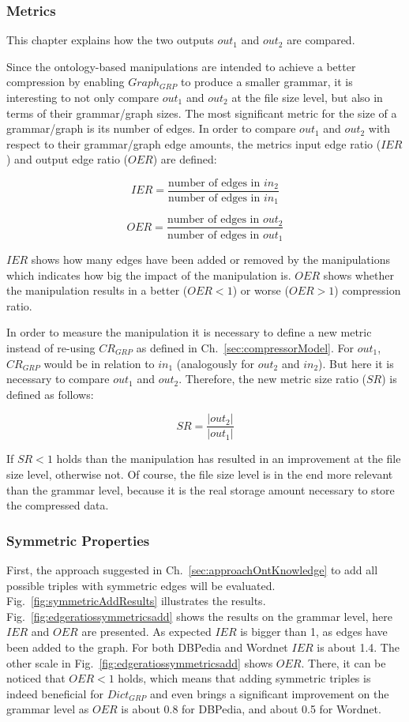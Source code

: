 \subsubsection{Metrics}

This chapter explains how the two outputs $out_1$ and $out_2$ are compared.

Since the ontology-based manipulations are intended to achieve a better compression by enabling $Graph_{GRP}$ to produce a smaller grammar, it is interesting to not only compare $out_1$ and $out_2$ at the file size level, but also in terms of their grammar/graph sizes. The most significant metric for the size of a grammar/graph is its number of edges. In order to compare $out_1$ and $out_2$ with respect to their grammar/graph edge amounts, the metrics input edge ratio ($IER$) and output edge ratio ($OER$)  are defined:
 
 \[
 IER=\frac {\text{number of edges in } in_2} {\text{number of edges in  } in_1}
 \]
 
 \[
 OER=\frac {\text{number of edges in } out_2} {\text{number of edges in } out_1}
 \]
 
$IER$ shows how many edges have been added or removed by the manipulations which indicates how big the impact of the manipulation is. $OER$  shows whether the manipulation results in a better ($OER<1$) or worse ($OER>1$) compression ratio.

In order to measure the manipulation it is necessary to define a new metric instead of re-using $CR_{GRP}$ as defined in Ch.~\ref{sec:compressorModel}. For $out_1$, $CR_{GRP}$ would be in relation to $in_1$ (analogously for $out_2$ and $in_2$). But here it is necessary to compare $out_1$ and $out_2$. Therefore, the new metric size ratio ($SR$) is defined as follows:

 \[
SR=\frac {|out_2|} {|out_1|}
\]

If $SR<1$ holds than the manipulation has resulted in an improvement at the file size level, otherwise not. Of course, the file size level is in the end more relevant than the grammar level, because it is the real storage amount necessary to store the compressed data.



\subsubsection{Symmetric Properties}

First, the approach suggested in Ch.~\ref{sec:approachOntKnowledge} to add all possible triples with symmetric edges will be evaluated. Fig.~\ref{fig:symmetricAddResults} illustrates the results. Fig.~\ref{fig:edgeratiossymmetricsadd} shows the results on the grammar level, here $IER$ and $OER$ are presented. As expected $IER$ is bigger than 1, as edges have been added to the graph. For both DBPedia and Wordnet $IER$ is about 1.4. The other scale in Fig.~\ref{fig:edgeratiossymmetricsadd} shows $OER$. There, it can be noticed that $OER<1$ holds, which means that adding symmetric triples is indeed beneficial for $Dict_{GRP}$ and even brings a significant improvement on the grammar level as $OER$ is about 0.8 for DBPedia, and about 0.5 for Wordnet.

